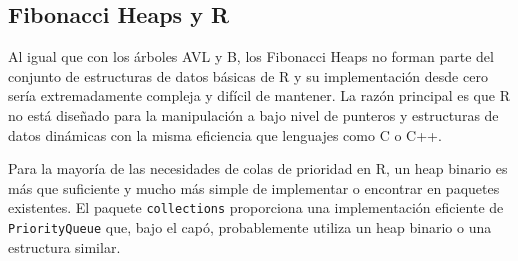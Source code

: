 \documentclass[
  spanish,
  letterpaper,
  DIV=11,
  numbers=noendperiod]{scrreprt}
\begin{document}
\subsection{Fibonacci Heaps y R}\label{fibonacci-heaps-y-r}

Al igual que con los árboles AVL y B, los Fibonacci Heaps no forman
parte del conjunto de estructuras de datos básicas de R y su
implementación desde cero sería extremadamente compleja y difícil de
mantener. La razón principal es que R no está diseñado para la
manipulación a bajo nivel de punteros y estructuras de datos dinámicas
con la misma eficiencia que lenguajes como C o C++.

Para la mayoría de las necesidades de colas de prioridad en R, un heap
binario es más que suficiente y mucho más simple de implementar o
encontrar en paquetes existentes. El paquete \texttt{collections}
proporciona una implementación eficiente de \texttt{PriorityQueue} que,
bajo el capó, probablemente utiliza un heap binario o una estructura
similar.
\end{document}
